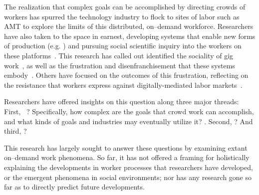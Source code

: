 \documentclass[trackingWork]{subfiles}
\begin{document}
The realization that complex goals can be accomplished by directing  crowds of workers has spurred the technology industry to flock to sites of labor
such as AMT to explore the limits of this distributed, on--demand workforce.
Researchers have also taken to the space in earnest,
developing systems that enable new forms of production
(e.g. \cite{bernsteinSoylent,vizwiz,paolacci2010running}) and pursuing social scientific inquiry into the workers on these platforms~\cite{Ross,whoareNOTtheTurkers}.
This research has called out identified the sociality of gig work~\cite{crowdcollab},
as well as the frustration and disenfranchisement that these systems embody~\cite{turkopticon,martin2014being,takingAHITMcInnis}.
Others have focused on the outcomes of this frustration,
reflecting on the resistance that workers express against digitally-mediated labor markets~\cite{uberAlgorithm,dynamo}.


Researchers have offered insights on this question along three major threads:
First, ~\cite{crowdForgeKittur}?
      Specifically, how complex are the goals that crowd work can accomplish, and what kinds of goals and industries may eventually utilize it?
      \cite{foundry,suzukiAtelier,KimStoria,yuanAlmost,YuEncouragingOutside,
            Nebeling:2016:WCW:2858036.2858169,
            Hahn:2016:KAB:2858036.2858364}.
Second, 
      \cite{embracingErrorKrishna,bernsteinSoylent,sensitiveTasks,
            LykourentzouPersonalityMatters,KucherbaevReLauncher,
            Law:2016:CKC:2858036.2858144,Cai:2016:CRI:2858036.2858237,
            Chang:2016:ACC:2858036.2858411,Newell:2016:OMA:2858036.2858490}?
And third, 
      \cite{turkopticon,storiesIraniSilberman,dynamo,crowdcollab,
            whyWouldAnyoneBrewer,takingAHITMcInnis}?

This research has largely sought to answer these questions by examining extant on--demand work phenomena.
So far, it has not offered a framing for holistically explaining
the developments in worker processes that researchers have developed, or
the emergent phenomena in social environments;
nor has any research
gone so far as to directly predict future developments.
\end{document}
